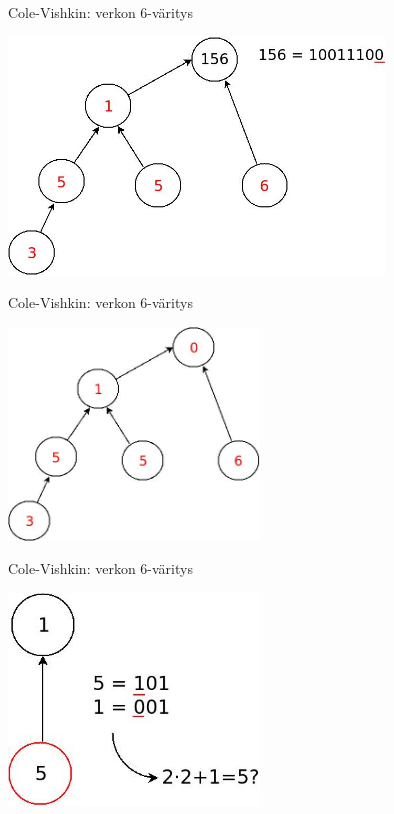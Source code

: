 \documentclass[a4paper, 12pt, finnish]{beamer}
\begin{document}
\begin{frame}{Cole-Vishkin: verkon 6-väritys}
    \begin{center} 
        \includegraphics[width=0.75\textwidth]{Diagram9.jpeg} 
    \end{center} 
\end{frame}

\begin{frame}{Cole-Vishkin: verkon 6-väritys}
    \begin{center} 
        \includegraphics[width=0.5\textwidth]{Diagram10.jpeg} 
    \end{center} 
\end{frame}

\begin{frame}{Cole-Vishkin: verkon 6-väritys}
    \begin{center} 
        \includegraphics[width=0.5\textwidth]{Diagram11.jpeg} 
    \end{center} 
\end{frame}
\end{document}
